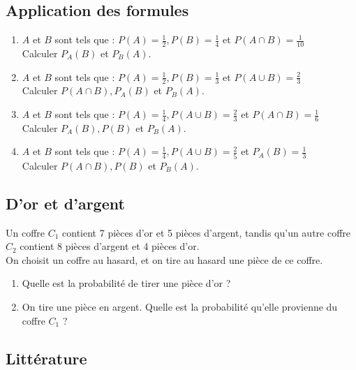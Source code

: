 \documentclass[oneside,12pt]{article}          %
\begin{document}
\subsection{Application des formules}
\begin{enumerate}
    \item $A$ et $B$ sont tels que : $P(A)=\frac{1}{2},P(B)=\frac{1}{4}$ et $P(A\cap B)=\frac{1}{10}$ \\
    Calculer $P_{A}(B)$ et $P_{B}(A)$.
    \item $A$ et $B$ sont tels que : $P(A)=\frac{1}{2},P(B)=\frac{1}{3}$ et $P(A\cup B)=\frac{2}{3}$ \\
    Calculer $P(A\cap B),P_{A}(B)$ et $P_{B}(A)$.

    \item $A$ et $B$ sont tels que : $P(A)=\frac{1}{4},P(A\cup B)=\frac{2}{3}$ et $P(A\cap B)=\frac{1}{6}$ \\
    Calculer $P_{A}(B),P(B)$ et $P_{B}(A)$.
    \item $A$ et $B$ sont tels que : $P(A)=\frac{1}{4},P(A\cup B)=\frac{2}{5}$ et $P_{A}(B)=\frac{1}{3}$ \\
    Calculer $P(A\cap B), P(B) $ et $P_{B}(A)$.
\end{enumerate}


\subsection{D'or et d'argent}
 Un coffre $C_{1}$ contient 7 pièces d'or et 5 pièces d'argent, tandis qu'un autre coffre $C_{2}$ contient 8 pièces d'argent et 4 pièces d'or. \\
On choisit un coffre au hasard, et on tire au hasard une pièce de ce coffre. 
\begin{enumerate}
    \item Quelle est la probabilité de tirer une pièce d'or ?
    \item On tire une pièce en argent. Quelle est la probabilité qu'elle provienne du coffre $C_{1}$ ?
\end{enumerate}



\subsection{Littérature}
\end{document}

